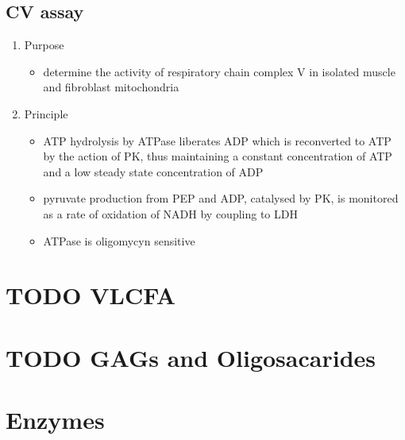 \documentclass{scrartcl}
\begin{document}
\subsection{CV assay}
\label{sec:org379375b}
\begin{enumerate}
\item Purpose
\label{sec:org67150b6}
\begin{itemize}
\item determine the activity of respiratory chain complex V in isolated
muscle and fibroblast mitochondria
\end{itemize}

\item Principle
\label{sec:orgd475fde}
\begin{itemize}
\item ATP hydrolysis by ATPase liberates ADP which is reconverted to ATP
by the action of PK, thus maintaining a constant concentration of
ATP and a low steady state concentration of ADP
\item pyruvate production from PEP and ADP, catalysed by PK, is monitored
as a rate of oxidation of NADH by coupling to LDH
\item ATPase is oligomycyn sensitive
\end{itemize}


\end{enumerate}
\section{{\bfseries\sffamily TODO} VLCFA}
\label{sec:org3556477}
\section{{\bfseries\sffamily TODO} GAGs and Oligosacarides}
\label{sec:org4a53983}
\section{Enzymes}
\label{sec:org4df4e8a}
\end{document}
